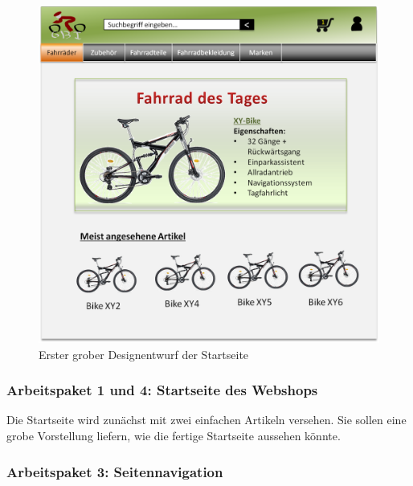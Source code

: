 \begin{figure}[H]
\begin{center}
\includegraphics[width=150mm]{Bilder/Abbildung2-GroberDesignEntwurfDesWebshops.png}
\end{center}
\caption{Erster grober Designentwurf der Startseite}
\end{figure}


\subsubsection{Arbeitspaket 1 und 4: Startseite des Webshops}

Die Startseite wird zunächst mit zwei einfachen Artikeln versehen. Sie sollen eine grobe Vorstellung liefern, wie die fertige Startseite aussehen könnte.

\subsubsection{Arbeitspaket 3: Seitennavigation}


